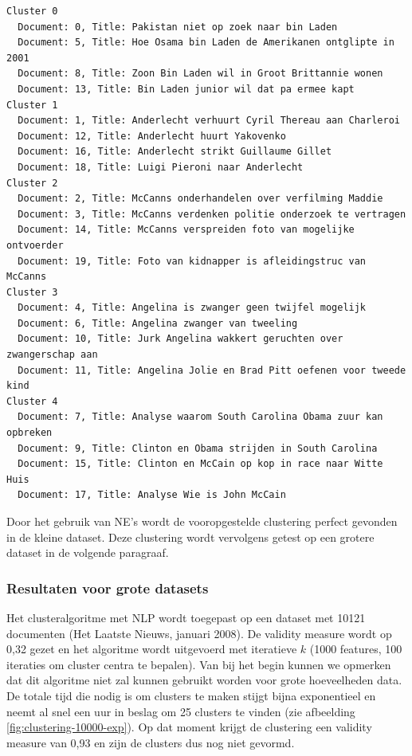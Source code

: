 \begin{lstlisting}
Cluster 0
  Document: 0, Title: Pakistan niet op zoek naar bin Laden
  Document: 5, Title: Hoe Osama bin Laden de Amerikanen ontglipte in 2001
  Document: 8, Title: Zoon Bin Laden wil in Groot Brittannie wonen
  Document: 13, Title: Bin Laden junior wil dat pa ermee kapt
Cluster 1
  Document: 1, Title: Anderlecht verhuurt Cyril Thereau aan Charleroi
  Document: 12, Title: Anderlecht huurt Yakovenko
  Document: 16, Title: Anderlecht strikt Guillaume Gillet
  Document: 18, Title: Luigi Pieroni naar Anderlecht
Cluster 2
  Document: 2, Title: McCanns onderhandelen over verfilming Maddie
  Document: 3, Title: McCanns verdenken politie onderzoek te vertragen
  Document: 14, Title: McCanns verspreiden foto van mogelijke ontvoerder
  Document: 19, Title: Foto van kidnapper is afleidingstruc van McCanns
Cluster 3
  Document: 4, Title: Angelina is zwanger geen twijfel mogelijk
  Document: 6, Title: Angelina zwanger van tweeling
  Document: 10, Title: Jurk Angelina wakkert geruchten over zwangerschap aan
  Document: 11, Title: Angelina Jolie en Brad Pitt oefenen voor tweede kind
Cluster 4
  Document: 7, Title: Analyse waarom South Carolina Obama zuur kan opbreken
  Document: 9, Title: Clinton en Obama strijden in South Carolina
  Document: 15, Title: Clinton en McCain op kop in race naar Witte Huis
  Document: 17, Title: Analyse Wie is John McCain
\end{lstlisting}

Door het gebruik van NE's wordt de vooropgestelde clustering perfect gevonden in de kleine dataset. Deze clustering wordt vervolgens getest op een grotere dataset in de volgende paragraaf.

\subsubsection{Resultaten voor grote datasets}
Het clusteralgoritme met NLP wordt toegepast op een dataset met 10121 documenten (Het Laatste Nieuws, januari 2008). De validity measure wordt op 0,32 gezet en het algoritme wordt uitgevoerd met iteratieve $k$ (1000 features, 100 iteraties om cluster centra te bepalen). Van bij het begin kunnen we opmerken dat dit algoritme niet zal kunnen gebruikt worden voor grote hoeveelheden data. De totale tijd die nodig is om clusters te maken stijgt bijna exponentieel en neemt al snel een uur in beslag om 25 clusters te vinden (zie afbeelding \ref{fig:clustering-10000-exp}). Op dat moment krijgt de clustering een validity measure van 0,93 en zijn de clusters dus nog niet gevormd.

